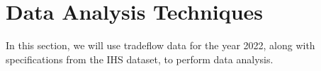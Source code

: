 \chapter{Data Analysis Techniques}

In this section, we will use tradeflow data for the year 2022, along with specifications from the IHS dataset, to perform data analysis.




